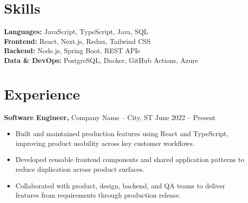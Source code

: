 \documentclass[11pt]{article}
\begin{document}
\section*{Skills}

\textbf{Languages:} JavaScript, TypeScript, Java, SQL \\
\textbf{Frontend:} React, Next.js, Redux, Tailwind CSS \\
\textbf{Backend:} Node.js, Spring Boot, REST APIs \\
\textbf{Data \& DevOps:} PostgreSQL, Docker, GitHub Actions, Azure

\vspace{-6.5pt}

%
%
\section*{Experience}

\textbf{Software Engineer,} {Company Name} -- City, ST
\hfill June 2022 -- Present \\

\vspace{-9pt}

\begin{itemize}
  \item Built and maintained production features using React and TypeScript, improving product usability across key customer workflows.
  \item Developed reusable frontend components and shared application patterns to reduce duplication across product surfaces.
  \item Collaborated with product, design, backend, and QA teams to deliver features from requirements through production release.
\end{itemize}
\end{document}
